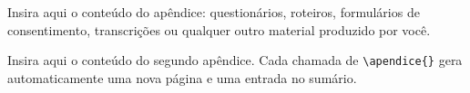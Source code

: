 

Insira aqui o conteúdo do apêndice: questionários, roteiros, formulários de
consentimento, transcrições ou qualquer outro material produzido por você.


Insira aqui o conteúdo do segundo apêndice. Cada chamada de \verb|\apendice{}|
gera automaticamente uma nova página e uma entrada no sumário.
